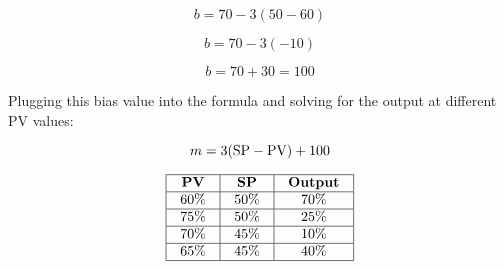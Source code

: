 $$b = 70 - 3 (50 - 60)$$

$$b = 70 - 3 (-10)$$

$$b = 70 + 30 = 100$$

Plugging this bias value into the formula and solving for the output at different PV values:

$$m = 3 (\hbox{SP} - \hbox{PV}) + 100$$


$$\vbox{\offinterlineskip
\halign{\strut
\vrule \quad\hfil # \ \hfil & 
\vrule \quad\hfil # \ \hfil & 
\vrule \quad\hfil # \ \hfil \vrule \cr
\noalign{\hrule}
%
{\bf PV} & {\bf SP} & {\bf Output} \cr
%
\noalign{\hrule}
%
60\% & 50\% & 70\% \cr
%
\noalign{\hrule}
%
75\% & 50\% & 25\% \cr
%
\noalign{\hrule}
%
70\% & 45\% & 10\% \cr
%
\noalign{\hrule}
%
65\% & 45\% & 40\% \cr
%
\noalign{\hrule}
} %
}$$ %





